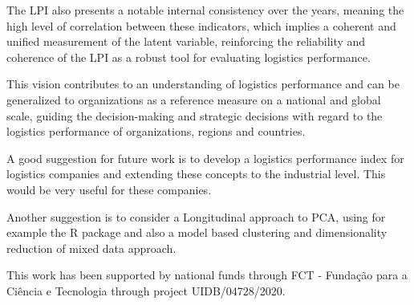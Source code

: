 \documentclass[conference]{IEEEtran}
\begin{document}
The LPI also presents a notable internal consistency over the years, meaning the high level of correlation between these indicators, which  implies a coherent and unified measurement of the latent variable, reinforcing the reliability and coherence of the LPI as a robust tool for evaluating logistics performance.

This vision contributes to an understanding of logistics performance and can be generalized to organizations as a reference measure on a national and global scale, guiding the decision-making and strategic decisions with regard to the logistics performance of organizations, regions and countries.

A good suggestion for future work is to develop a logistics performance index for logistics companies and extending these concepts to the industrial level. This would be very useful for these companies. 

Another suggestion is to consider a Longitudinal approach to PCA, using for example the R package \cite{jarmund2022alasca} and also a model based clustering and dimensionality reduction of mixed data \cite{ranalli2017model} approach.




\begin{acks}
This work has been supported by national funds through FCT - Fundação para a Ciência e Tecnologia through project UIDB/04728/2020.
\end{acks}










\end{document}
